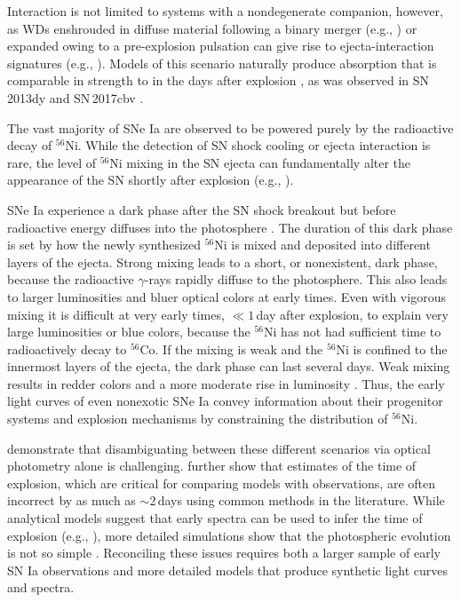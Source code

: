 \documentclass[twocolumn]{aastex61}
\begin{document}
Interaction is not limited to systems with a nondegenerate companion,
however, as WDs enshrouded in diffuse material following a binary merger
(e.g., \citealt{2015MNRAS.447.2803L}) or expanded owing to a pre-explosion
pulsation can give rise to ejecta-interaction signatures (e.g.,
\citealt{2014MNRAS.441..532D}). Models of this scenario naturally produce
 absorption that is comparable in strength to  in the
days after explosion \citep{2014MNRAS.441..532D}, as was observed in
SN\,2013dy \citep{2013ApJ...778L..15Z} and SN\,2017cbv
\citep{2017ApJ...845L..11H}.

The vast majority of SNe Ia are observed to be powered purely by the
radioactive decay of $^{56}$Ni. While the detection of SN shock cooling or
ejecta interaction is rare, the level of $^{56}$Ni mixing in the SN ejecta
can fundamentally alter the appearance of the SN shortly after explosion
(e.g.,
\citealt{2014MNRAS.441..532D,2016ApJ...826...96P,2017MNRAS.472.2787N}).

SNe Ia experience a dark phase after the SN shock breakout but before
radioactive energy diffuses into the photosphere
\citep{2014ApJ...784...85P}. The duration of this dark phase is set by how
the newly synthesized $^{56}$Ni is mixed and deposited into different layers
of the ejecta. Strong mixing leads to a short, or nonexistent, dark phase,
because the radioactive $\gamma$-rays rapidly diffuse to the photosphere.
This also leads to larger luminosities and bluer optical colors at early
times. Even with vigorous mixing it is difficult at very early times, $\ll
1$\,day after explosion, to explain very large luminosities or blue colors,
because the $^{56}$Ni has not had sufficient time to radioactively decay to
$^{56}$Co. If the mixing is weak and the $^{56}$Ni is confined to the
innermost layers of the ejecta, the dark phase can last several days. Weak
mixing results in redder colors and a more moderate rise in luminosity
\citep{2014MNRAS.441..532D,2016ApJ...826...96P}. Thus, the early light
curves of even nonexotic SNe Ia convey information about their progenitor
systems and explosion mechanisms by constraining the distribution of
$^{56}$Ni.

\citet{2017MNRAS.472.2787N} demonstrate that disambiguating between these
different scenarios via optical photometry alone is challenging.
\citeauthor{2017MNRAS.472.2787N} further show that estimates of the time of
explosion, which are critical for comparing models with observations, are
often incorrect by as much as $\sim$2\,days using common methods in the
literature. While analytical models suggest that early spectra can be used to
infer the time of explosion (e.g., \citealt{2014ApJ...784...85P}), more
detailed simulations show that the photospheric evolution is not so simple
\citep{2016ApJ...826...96P}. Reconciling these issues requires both a larger
sample of early SN Ia observations and more detailed models that produce
synthetic light curves and spectra.
\end{document}
